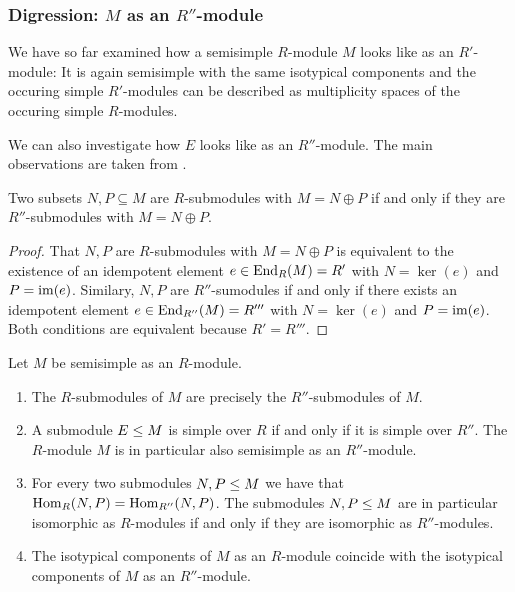 




\subsubsection{Digression: $M$ as an $R''$-module}

\begin{fluff}
  We have so far examined how a semisimple $R$-module $M$ looks like as an $R'$-module:
  It is again semisimple with the same isotypical components and the occuring simple $R'$-modules can be described as multiplicity spaces of the occuring simple $R$-modules.
  
  We can also investigate how $E$ looks like as an $R''$-module.
  The main observations are taken from \cite[Chapter~2.6]{DaSilva2017NonCommutative}.
\end{fluff}


\begin{lemma}
  \label{lemma: same direct sum decompositions}
  Two subsets $N, P \subseteq M$ are $R$-submodules with $M = N \oplus P$ if and only if they are $R''$-submodules with $M = N \oplus P$.
\end{lemma}


\begin{proof}
  That $N, P$ are $R$-submodules with $M = N \oplus P$ is equivalent to the existence of an idempotent element $e \in \operatorname{End}_R(M) = R'$ with $N = \ker(e)$ and $P = \operatorname{im}(e)$.
  Similary, $N, P$ are $R''$-sumodules if and only if there exists an idempotent element $e \in \operatorname{End}_{R''}(M) = R'''$ with $N = \ker(e)$ and $P = \operatorname{im}(e)$.
  Both conditions are equivalent because $R' = R'''$.
\end{proof}


\begin{proposition}
  Let $M$ be semisimple as an $R$-module.
  \begin{enumerate}
    \item
      \label{enumerate: same submodules}
      The $R$-submodules of $M$ are precisely the $R''$-submodules of $M$.
    \item
      A submodule $E \leq M$ is simple over $R$ if and only if it is simple over $R''$.
      The $R$-module $M$ is in particular also semisimple as an $R''$-module.
    \item
      \label{enumerate: same isomorphisms}
      For every two submodules $N, P \leq M$ we have that $\operatorname{Hom}_R(N,P) = \operatorname{Hom}_{R''}(N,P)$.
      The submodules $N, P \leq M$ are in particular isomorphic as $R$-modules if and only if they are isomorphic as $R''$-modules.
    \item
      The isotypical components of $M$ as an $R$-module coincide with the isotypical components of $M$ as an $R''$-module.
  \end{enumerate}
\end{proposition}


